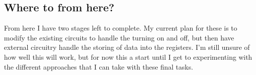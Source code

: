 \documentclass[11pt]{scrartcl}
\begin{document}
\subsection*{Where to from here?}
From here I have two stages left to complete. My current plan for these is to modify the
existing circuits to handle the turning on and off, but then have external circuitry
handle the storing of data into the registers. I'm still unsure of how well this will work,
but for now this a start until I get to experimenting with the different approaches that
I can take with these final tasks.
\end{document}
